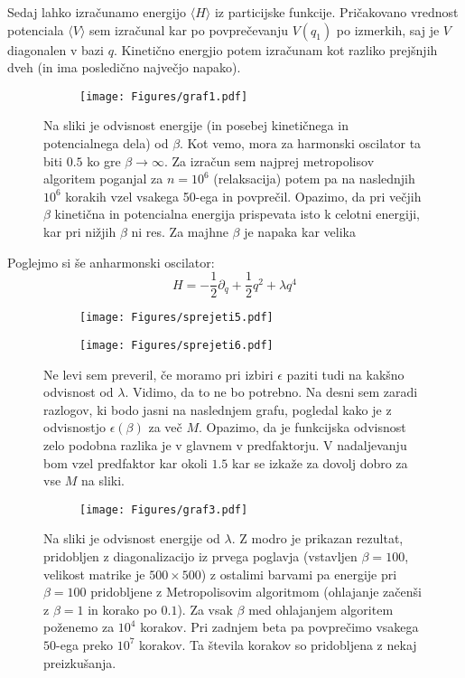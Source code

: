 \documentclass{article}
\begin{document}
Sedaj lahko izračunamo energijo $\langle H \rangle$ iz particijske funkcije. Pričakovano vrednost potenciala $\langle V \rangle$ sem izračunal kar po povprečevanju $V(q_1)$ po izmerkih, saj je $V$ diagonalen v bazi $q$. Kinetično energjio potem izračunam kot razliko prejšnjih dveh (in ima posledično največjo napako).

\begin{figure}[H]
\centering
\begin{subfigure}{\textwidth}
\texttt{[image: Figures/graf1.pdf]}
\end{subfigure}
\caption*{Na sliki je odvisnost energije (in posebej kinetičnega in potencialnega dela) od $\beta$. Kot vemo, mora za harmonski oscilator ta biti $0.5$ ko gre $\beta \to \infty$. Za izračun sem najprej metropolisov algoritem poganjal za $n=10^6$ (relaksacija) potem pa na naslednjih $10^6$ korakih vzel vsakega 50-ega in povprečil. Opazimo, da pri večjih $\beta$ kinetična in potencialna energija prispevata isto k celotni energiji, kar pri nižjih $\beta$ ni res. Za majhne $\beta$ je napaka kar velika}
\end{figure}

Poglejmo si še anharmonski oscilator:
\begin{equation*}
H = -\frac{1}{2} \partial_q + \frac{1}{2} q^2 + \lambda q^4
\end{equation*}

\begin{figure}[H]
\centering
\begin{subfigure}{.49\textwidth}
\texttt{[image: Figures/sprejeti5.pdf]}
\end{subfigure}
\begin{subfigure}{.49\textwidth}
\texttt{[image: Figures/sprejeti6.pdf]}
\end{subfigure}
\caption*{Ne levi sem preveril, če moramo pri izbiri $\epsilon$ paziti tudi na kakšno odvisnost od $\lambda$. Vidimo, da to ne bo potrebno. Na desni sem zaradi razlogov, ki bodo jasni na naslednjem grafu, pogledal kako je z odvisnostjo $\epsilon(\beta)$ za več $M$. Opazimo, da je funkcijska odvisnost zelo podobna razlika je v glavnem v predfaktorju. V nadaljevanju bom vzel predfaktor kar okoli $1.5$ kar se izkaže za dovolj dobro za vse $M$ na sliki.}
\end{figure}

\begin{figure}[H]
\centering
\begin{subfigure}{\textwidth}
\texttt{[image: Figures/graf3.pdf]}
\end{subfigure}
\caption*{Na sliki je odvisnost energije od $\lambda$. Z modro je prikazan rezultat, pridobljen z diagonalizacijo iz prvega poglavja (vstavljen $\beta=100$, velikost matrike je $500 \times 500$) z ostalimi barvami pa energije pri $\beta=100$ pridobljene z Metropolisovim algoritmom (ohlajanje začenši z $\beta=1$ in korako po $0.1$). Za vsak $\beta$ med ohlajanjem algoritem poženemo za $10^4$ korakov. Pri zadnjem beta pa povprečimo vsakega $50$-ega preko $10^7$ korakov. Ta števila korakov so pridobljena z nekaj preizkušanja. }
\end{figure}
\end{document}
